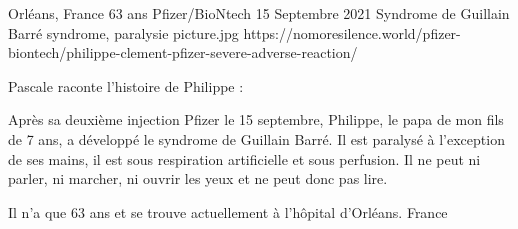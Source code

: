 {Orléans, France}
{63 ans}
{Pfizer/BioNtech}
{15 Septembre 2021}
{Syndrome de Guillain Barré syndrome, paralysie}
{picture.jpg}
{https://nomoresilence.world/pfizer-biontech/philippe-clement-pfizer-severe-adverse-reaction/}
{

Pascale raconte l'histoire de Philippe :

Après sa deuxième injection Pfizer le 15 septembre, Philippe, le papa de mon
fils de 7 ans, a développé le syndrome de Guillain Barré. Il est paralysé à
l'exception de ses mains, il est sous respiration artificielle et sous
perfusion. Il ne peut ni parler, ni marcher, ni ouvrir les yeux et ne peut donc
pas lire.

Il n'a que 63 ans et se trouve actuellement à l'hôpital d'Orléans. France

}
